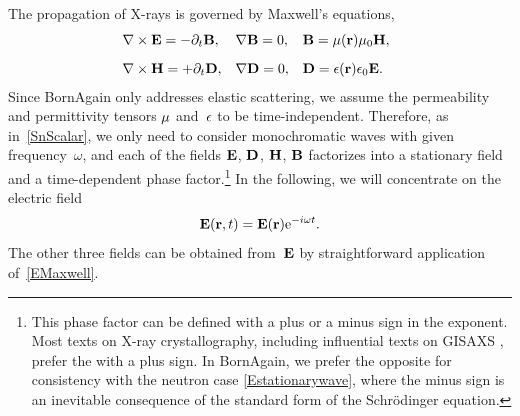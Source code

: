 The propagation of X-rays is governed by Maxwell's equations,
%
\begin{equation}\label{EMaxwell}
  \begin{array}{@{}l@{\quad}l@{\quad}l}
    \Nabla\times\v{E}=-\partial_t \v{B},
   &\Nabla\v{B}=0,
   &\v{B}=\v{\mu}(\r)\mu_0\v{H},
   \\[2ex]
    \Nabla\times\v{H}=+\partial_t \v{D},
   &\Nabla\v{D}=0,
   &\v{D}=\v{\eps}(\r)\eps_0\v{E}.
  \end{array}
\end{equation}
%
%
%
%
%
%
Since BornAgain only addresses elastic scattering,
%
%
we assume the permeability and permittivity tensors $\mathbf{\mu}$ and~$\mathbf{\epsilon}$
to be time-independent.
%
Therefore, as in~\cref{SnScalar}, we only need to consider monochromatic waves
%
%
with given frequency~$\omega$,
and each of the fields $\mathbf{E}$, $\mathbf{D}$, $\mathbf{H}$, $\mathbf{B}$
factorizes into a stationary field and a time-dependent phase factor.\footnote
{This phase factor can be defined with a plus or a minus sign in the exponent.
Most texts on X-ray crystallography,
including influential texts on GISAXS \cite{ReLL09},
prefer the  with a plus sign.
%
%
%
%
In BornAgain, we prefer the opposite 
%
for consistency with the neutron case \cref{Estationarywave},
where the minus sign is an inevitable consequence
of the standard form of the Schrödinger equation.%
%
}
%
In the following, we will concentrate on the electric field
%
\begin{equation}\label{EstationaryX}
  \mathbf{E}(\mathbf{r},t) = \mathbf{E}(\mathbf{r})\mathrm e^{-i\omega t}.
\end{equation}
The other three fields can be obtained from~$\mathbf{E}$
by straightforward application of~\cref{EMaxwell}.

